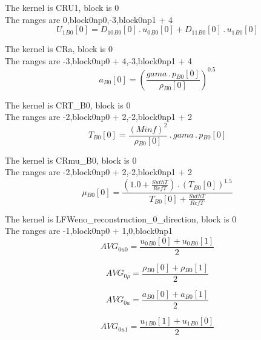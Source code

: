 \documentclass{article}
\begin{document}
\noindent The kernel is CRU1, block is 0\\\noindent The ranges are 0,block0np0,-3,block0np1 + 4\\\begin{dmath}{U_{1}{_{B0}}}[{0}] = {D_{10}{_{B0}}}[{0}] \,.\, {u_{0}{_{B0}}}[{0}] + {D_{11}{_{B0}}}[{0}] \,.\, {u_{1}{_{B0}}}[{0}]\end{dmath}

\noindent The kernel is CRa, block is 0\\\noindent The ranges are -3,block0np0 + 4,-3,block0np1 + 4\\\begin{dmath}{a{_{B0}}}[{0}] = \left(\frac{gama \,.\, {p{_{B0}}}[{0}]}{{\rho{_{B0}}}[{0}]} \right)^{0.5}\end{dmath}

\noindent The kernel is CRT_B0, block is 0\\\noindent The ranges are -2,block0np0 + 2,-2,block0np1 + 2\\\begin{dmath}{T{_{B0}}}[{0}] = \frac{\left(Minf \right)^{2}}{{\rho{_{B0}}}[{0}]} \,.\, gama \,.\, {p{_{B0}}}[{0}]\end{dmath}

\noindent The kernel is CRmu_B0, block is 0\\\noindent The ranges are -2,block0np0 + 2,-2,block0np1 + 2\\\begin{dmath}{\mu{_{B0}}}[{0}] = \frac{\left(1.0 + \frac{SuthT}{RefT}\right) \,.\, \left({T{_{B0}}}[{0}] \right)^{1.5}}{{T{_{B0}}}[{0}] + \frac{SuthT}{RefT}}\end{dmath}

\noindent The kernel is LFWeno_reconstruction_0_direction, block is 0\\\noindent The ranges are -1,block0np0 + 1,0,block0np1\\\begin{dmath}AVG_{0 u0} = \frac{{u_{0}{_{B0}}}[{0}] + {u_{0}{_{B0}}}[{1}]}{2}\end{dmath}

\begin{dmath}AVG_{0 \rho} = \frac{{\rho{_{B0}}}[{0}] + {\rho{_{B0}}}[{1}]}{2}\end{dmath}

\begin{dmath}AVG_{0 a} = \frac{{a{_{B0}}}[{0}] + {a{_{B0}}}[{1}]}{2}\end{dmath}

\begin{dmath}AVG_{0 u1} = \frac{{u_{1}{_{B0}}}[{1}] + {u_{1}{_{B0}}}[{0}]}{2}\end{dmath}
\end{document}
